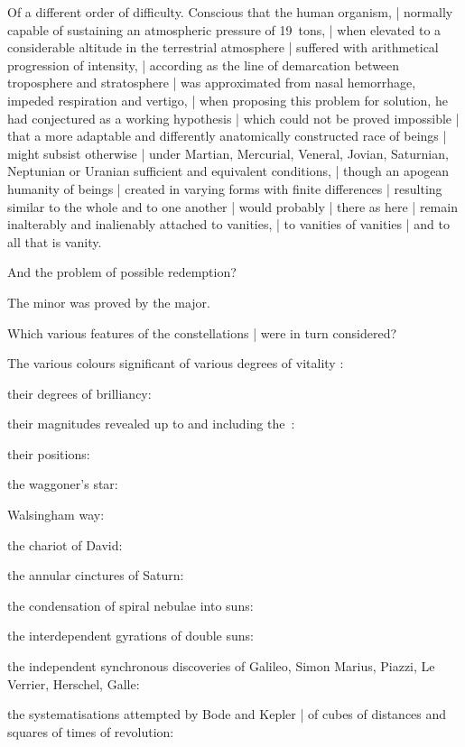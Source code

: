 \Science
Of a different order of difficulty.
Conscious that the human organism, |
normally capable of sustaining an atmospheric pressure of 19~tons, |
when elevated to a considerable altitude in the terrestrial atmosphere |
suffered with arithmetical progression of intensity, |
according as the line of demarcation between troposphere and stratosphere |
was approximated from nasal hemorrhage, impeded respiration and vertigo, |
when proposing this problem for solution,
he had conjectured as a working hypothesis |
which could not be proved impossible |
that a more adaptable and differently anatomically constructed race of beings |
might subsist otherwise |
under Martian, Mercurial, Veneral, Jovian, Saturnian, Neptunian
or Uranian sufficient and equivalent conditions, |
though an apogean humanity of beings |
created in varying forms with finite differences |
resulting similar to the whole and to one another |
would probably |
there as here |
remain inalterably and inalienably attached to vanities, |
to vanities of vanities |
and to all that is vanity.%


And the problem of possible redemption?

\Philosophy
The minor was proved by the major.


Which various features of the constellations |
were in turn considered?

\Poetry
The various colours significant of various degrees of vitality
:

\Places
their degrees of brilliancy:

\Memories
their magnitudes revealed up to and including the~:

\Religious
their positions:

\Factual
the waggoner's star:

\Household
Walsingham way:

\Science
the chariot of David:

\Philosophy
the annular cinctures of Saturn:

\Poetry
the condensation of spiral nebulae into suns:

\Memories
the interdependent gyrations of double suns:

\Places
the independent synchronous discoveries of Galileo, Simon Marius,
Piazzi, Le Verrier, Herschel, Galle:

\Religious
the systematisations attempted by Bode and Kepler |
of cubes of distances and squares of times of revolution:

